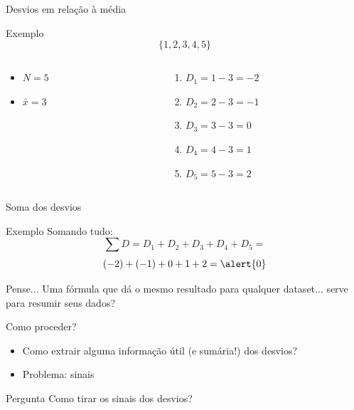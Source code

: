 \documentclass{beamer}
\begin{document}
\begin{frame}{Desvios em relação à média}
\begin{exampleblock}{Exemplo}
  \begin{displaymath}
    \{1,2,3,4,5\}
  \end{displaymath}

  \begin{columns}
    \begin{column}{5cm}
  \begin{itemize}
  \item $N=5$
  \item $\bar{x} = 3$
  \end{itemize}
\end{column}
\begin{column}{5cm}
  \begin{enumerate}
  \item $D_1 = 1-3 = -2$
  \item $D_2 = 2-3 = -1$
  \item $D_3 = 3-3 = 0$
  \item $D_4 = 4-3 = 1$
  \item $D_5 = 5-3 = 2$
  \end{enumerate}
\end{column}
\end{columns}
\end{exampleblock}
\end{frame}

\begin{frame}{Soma dos desvios}
  \begin{exampleblock}{Exemplo}
    Somando tudo:
    \begin{displaymath}
    \sum D = D_1 + D_2 + D_3 + D_4 + D_5 =
  \end{displaymath}
  \begin{displaymath}
    (-2) + (-1) + 0 + 1 + 2 = \alert{0}
  \end{displaymath}
  \end{exampleblock}
  \begin{block}{Pense...}
    Uma fórmula que dá o mesmo resultado para qualquer dataset... serve para resumir seus dados?
  \end{block}
\end{frame}

\begin{frame}{Como proceder?}
  \begin{itemize}
  \item Como extrair alguma informação útil (e sumária!) dos desvios?
  \item Problema: sinais
  \end{itemize}
  \begin{block}{Pergunta}
    Como tirar os sinais dos desvios?
  \end{block}
\end{frame}
\end{document}
